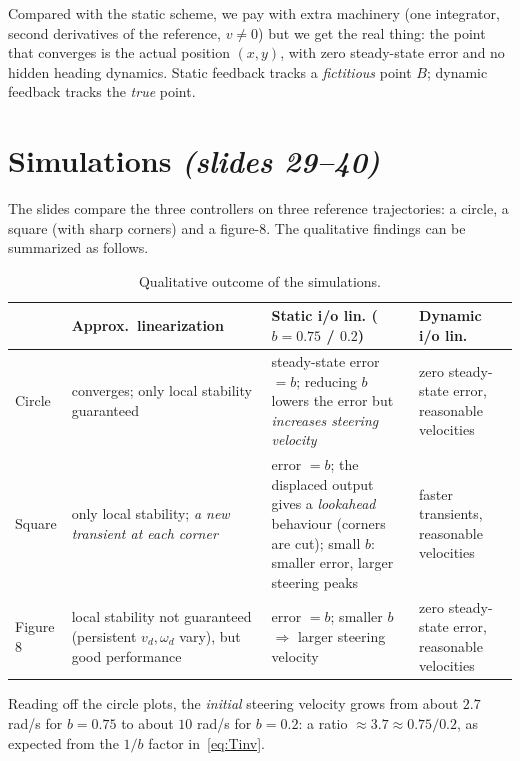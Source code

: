 \documentclass[11pt,a4paper]{article}
\newcommand{\vd}{v_d}
\newcommand{\omd}{\omega_d}
\theoremstyle{plain}
\theoremstyle{definition}
\theoremstyle{remark}
\begin{document}
\begin{intuition}
Compared with the static scheme, we pay with extra machinery (one integrator, second derivatives of the reference, $v\neq0$) but we get the real thing: the point that converges is the actual position $(x,y)$, with zero steady-state error and no hidden heading dynamics. Static feedback tracks a \emph{fictitious} point $B$; dynamic feedback tracks the \emph{true} point.
\end{intuition}

\section{Simulations \texorpdfstring{\emph{(slides 29--40)}}{(slides 29--40)}}

The slides compare the three controllers on three reference trajectories: a circle, a square (with sharp corners) and a figure-8. The qualitative findings can be summarized as follows.

\begin{table}[H]
\centering\small
\begin{tabularx}{\textwidth}{@{}l>{\raggedright\arraybackslash}X>{\raggedright\arraybackslash}X>{\raggedright\arraybackslash}X@{}}
\toprule
 & \textbf{Approx.\ linearization} & \textbf{Static i/o lin.} ($b=0.75$ / $0.2$) & \textbf{Dynamic i/o lin.}\\
\midrule
Circle & converges; only local stability guaranteed & steady-state error $=b$; reducing $b$ lowers the error but \emph{increases steering velocity} & zero steady-state error, reasonable velocities\\
Square & only local stability; \emph{a new transient at each corner} & error $=b$; the displaced output gives a \emph{lookahead} behaviour (corners are cut); small $b$: smaller error, larger steering peaks & faster transients, reasonable velocities\\
Figure 8 & local stability not guaranteed (persistent $\vd,\omd$ vary), but good performance & error $=b$; smaller $b$ $\Rightarrow$ larger steering velocity & zero steady-state error, reasonable velocities\\
\bottomrule
\end{tabularx}
\caption{Qualitative outcome of the simulations.}
\end{table}

Reading off the circle plots, the \emph{initial} steering velocity grows from about $2.7$ rad/s for $b=0.75$ to about $10$ rad/s for $b=0.2$: a ratio $\approx 3.7\approx 0.75/0.2$, as expected from the $1/b$ factor in~\eqref{eq:Tinv}.
\end{document}
